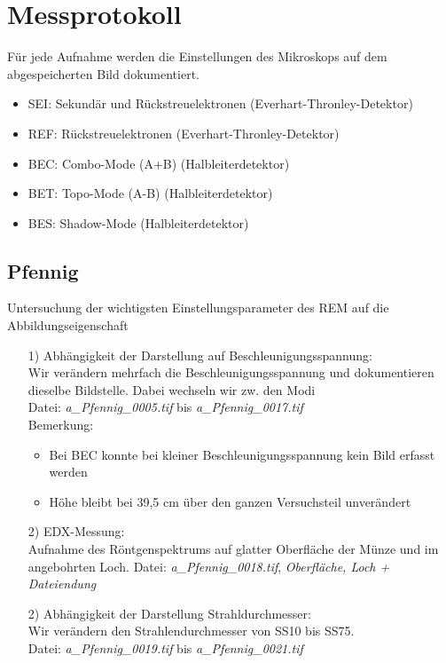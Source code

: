 
\def\skalierung{0.65}

\chapter{Messprotokoll}
\label{chap:protokoll}

Für jede Aufnahme werden die Einstellungen des Mikroskops auf dem abgespeicherten Bild dokumentiert.
\begin{itemize}
   \item SEI: Sekundär und Rückstreuelektronen (Everhart-Thronley-Detektor)
   \item REF: Rückstreuelektronen (Everhart-Thronley-Detektor)
   \item BEC: Combo-Mode (A+B) (Halbleiterdetektor)
   \item BET: Topo-Mode (A-B) (Halbleiterdetektor)
   \item BES: Shadow-Mode (Halbleiterdetektor)
\end{itemize}
\section*{Pfennig}
\label{sub:pfennig}
Untersuchung der wichtigsten Einstellungsparameter des REM auf die Abbildungseigenschaft
\begin{itemize}
   \item[1)] Abhängigkeit der Darstellung auf Beschleunigungsspannung:\\
   Wir verändern mehrfach die Beschleunigungsspannung und dokumentieren dieselbe Bildstelle. Dabei wechseln wir zw. den Modi\\
   Datei: \textit{a\_Pfennig\_0005.tif} bis \textit{a\_Pfennig\_0017.tif}\\
   Bemerkung:
   \begin{itemize}
      \item Bei BEC konnte bei kleiner Beschleunigungsspannung kein Bild erfasst werden
      \item Höhe bleibt bei 39,5 cm über den ganzen Versuchsteil unverändert
   \end{itemize}
   \item[2)] EDX-Messung:\\
   Aufnahme des Röntgenspektrums auf glatter Oberfläche der Münze und im angebohrten Loch.
   Datei: \textit{a\_Pfennig\_0018.tif}, \textit{Oberfläche, Loch + Dateiendung}
   \item[2)] Abhängigkeit der Darstellung Strahldurchmesser:\\
   Wir verändern den Strahlendurchmesser von SS10 bis SS75.\\
   Datei: \textit{a\_Pfennig\_0019.tif} bis \textit{a\_Pfennig\_0021.tif}
\end{itemize}
\newpage
